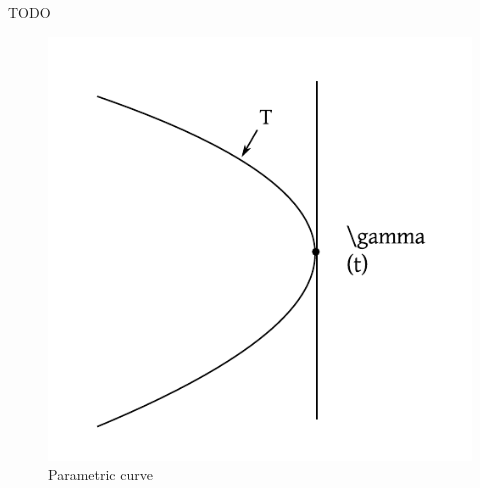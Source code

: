 \documentclass[a4paper,landscape,twocolumn]{article}
\theoremstyle{definition}
\begin{document}
TODO

\begin{figure}[h!]
  \begin{center}
    \includegraphics{img/parametric_curve_hyperbola.pdf}
    \caption{Parametric curve}
  \end{center}
\end{figure}
\end{document}
